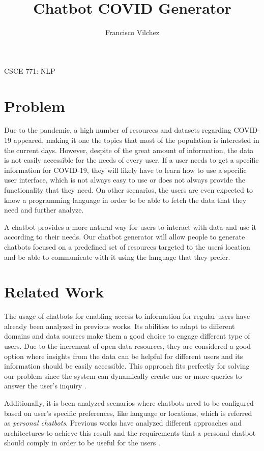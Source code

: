 \documentclass[]{article}
\title{Chatbot COVID Generator}
\author{Francisco Vilchez}
\makeatletter
\renewcommand\maketitle {
  \begin{center}
    {\Large{\course}}
    \medskip\par\noindent
    {\Large\textbf{\@title}}
    \medskip\par\noindent
    {\Large\@author}
    \medskip\par\noindent
    {\Large\@date}
    \bigskip\par\noindent
  \end{center}
}
\newcommand{\course}{CSCE 771: NLP}
\makeatother
\begin{document}
\maketitle

\section{Problem}

Due to the pandemic, a high number of resources and datasets regarding COVID-19 appeared, making it one the topics that most of the population is interested in the current days. However, despite of the great amount of information, the data is not easily accessible for the needs of every user. If a user needs to get a specific information for COVID-19, they will likely have to learn how to use a specific user interface, which is not always easy to use or does not always provide the functionality that they need. On other scenarios, the users are even expected to know a programming language in order to be able to fetch the data that they need and further analyze.

A chatbot provides a more natural way for users to interact with data and use it according to their needs. Our chatbot generator will allow people to generate chatbots focused on a predefined set of resources targeted to the user\'s location and be able to communicate with it using the language that they prefer.

\section{Related Work}
The usage of chatbots for enabling access to information for regular users have already been analyzed in previous works. Its abilities to adapt to different domains and data sources make them a good choice to engage different type of users. Due to the increment of open data resources, they are considered a good option where insights from the data can be helpful for different users and its information should be easily accessible. This approach fits perfectly for solving our problem since the system can dynamically create one or more queries to answer the user's inquiry \cite{srivastava2018decision}.

Additionally, it is been analyzed scenarios where chatbots need to be configured based on user's specific preferences, like language or locations, which is referred as \emph{personal chatbots}. Previous works have analyzed different approaches and architectures to achieve this result and the requirements that a personal chatbot should comply in order to be useful for the users \cite{daniel2018toward}.
\end{document}
